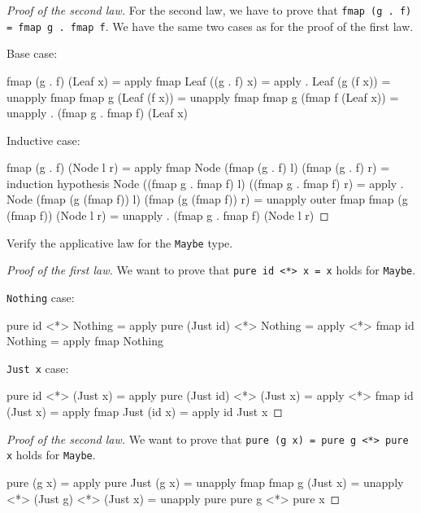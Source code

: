 \documentclass[12pt]{article}
\newenvironment{code}{\endgraf\verbatim}{\endverbatim}
\newenvironment{problem}[2][Problem]{\begin{trivlist}
\item[\hskip \labelsep {\bfseries #1}\hskip \labelsep {\bfseries #2.}]}{\end{trivlist}}
\begin{document}
\begin{proof}[Proof of the second law]
For the second law, we have to prove that \verb|fmap (g . f) = fmap g . fmap f|. We have the same two cases as for the proof of the first law.

Base case:

\begin{code}
  fmap (g . f) (Leaf x)
=   { apply fmap }
  Leaf ((g . f) x)
=   { apply . }
  Leaf (g (f x))
=   { unapply fmap }
  fmap g (Leaf (f x))
=   { unapply fmap }
  fmap g (fmap f (Leaf x))
=   { unapply . }
  (fmap g . fmap f) (Leaf x)
\end{code}

Inductive case:

\begin{code}
  fmap (g . f) (Node l r)
=   { apply fmap }
  Node (fmap (g . f) l) (fmap (g . f) r)
=   { induction hypothesis }
  Node ((fmap g . fmap f) l) ((fmap g . fmap f) r)
=   { apply . }
  Node (fmap (g (fmap f)) l) (fmap (g (fmap f)) r)
=   { unapply outer fmap }
  fmap (g (fmap f)) (Node l r)
=   { unapply . }
  (fmap g . fmap f) (Node l r)
\end{code}
\end{proof}


\begin{problem}{4}
Verify the applicative law for the \verb|Maybe| type.
\end{problem}

\begin{proof}[Proof of the first law]
We want to prove that \verb|pure id <*> x = x| holds for \verb|Maybe|.

\verb|Nothing| case:

\begin{code}
  pure id <*> Nothing
=   { apply pure }
  (Just id) <*> Nothing
=   { apply <*> }
  fmap id Nothing
=   { apply fmap }
  Nothing
\end{code}

\verb|Just x| case:

\begin{code}
  pure id <*> (Just x)
=   { apply pure }
  (Just id) <*> (Just x)
=   { apply <*> }
  fmap id (Just x)
=   { apply fmap }
  Just (id x)
=   { apply id }
  Just x
\end{code}
\end{proof}

\begin{proof}[Proof of the second law]
We want to prove that \verb|pure (g x) = pure g <*> pure x| holds for \verb|Maybe|.

\begin{code}
  pure (g x)
=   { apply pure }
  Just (g x)
=   { unapply fmap }
  fmap g (Just x)
=   { unapply <*> }
  (Just g) <*> (Just x)
=   { unapply pure }
  pure g <*> pure x
\end{code}
\end{proof}
\end{document}
